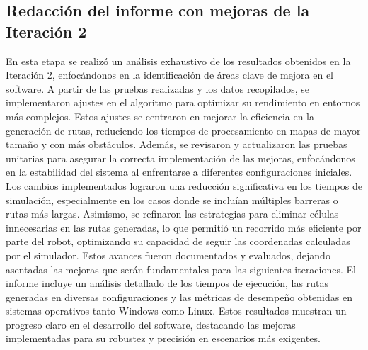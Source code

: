 \subsection{Redacci\'on del informe con mejoras de la Iteraci\'on 2}
    En esta etapa se realiz\'o un an\'alisis exhaustivo de los
        resultados obtenidos en la Iteraci\'on 2, enfoc\'andonos en la
        identificaci\'on de \'areas clave de mejora en el software. A
        partir de las pruebas realizadas y los datos recopilados, se
        implementaron ajustes en el algoritmo para optimizar su
        rendimiento en entornos m\'as complejos. Estos ajustes se
        centraron en mejorar la eficiencia en la generaci\'on de rutas,
        reduciendo los tiempos de procesamiento en mapas de
        mayor tama\~no y con m\'as obst\'aculos.
        \vskip 0.5cm
    Adem\'as, se revisaron y actualizaron las pruebas unitarias
        para asegurar la correcta implementaci\'on de las mejoras,
        enfoc\'andonos en la estabilidad del sistema al enfrentarse a
        diferentes configuraciones iniciales. Los cambios
        implementados lograron una reducci\'on significativa en los
        tiempos de simulaci\'on, especialmente en los casos donde se
        inclu\'ian m\'ultiples barreras o rutas m\'as largas.
        \vskip 0.5cm
    Asimismo, se refinaron las estrategias para eliminar c\'elulas
        innecesarias en las rutas generadas, lo que permiti\'o un
        recorrido m\'as eficiente por parte del robot, optimizando su
        capacidad de seguir las coordenadas calculadas por el
        simulador. Estos avances fueron documentados y evaluados,
        dejando asentadas las mejoras que ser\'an fundamentales para
        las siguientes iteraciones.
        \vskip 0.5cm
    El informe incluye un an\'alisis detallado de los tiempos de
        ejecuci\'on, las rutas generadas en diversas configuraciones y
        las m\'etricas de desempe\~no obtenidas en sistemas operativos
        tanto Windows como Linux. Estos resultados muestran un
        progreso claro en el desarrollo del software, destacando las
        mejoras implementadas para su robustez y precisi\'on en
        escenarios m\'as exigentes.
    \vskip 0.5cm